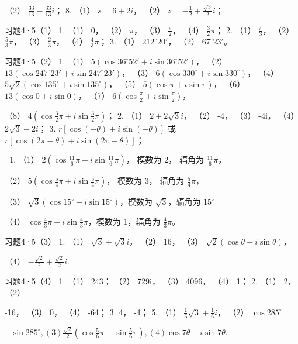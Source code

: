 （2） \(\frac{33}{13} - \frac{33}{13}i\)； 8. （1） \(s = 6 + 2i\)，
（2） \(z = -\frac{1}{2} + \frac{\sqrt{3}}{2}i\)；

习题4·5（1） 1. （1） 0， （2） \(\pi\)， （3） \(\frac{\pi}{2}\)，
（4） \(\frac{3}{2}\pi\)； 2. （1） \(\frac{\pi}{3}\)， （2）
\(\frac{5}{3}\pi\)， （3） \(\frac{2}{3}\pi\)， （4）
\(\frac{4}{3}\pi\)； 3. （1） \(212^{\circ}20'\)， （2）
\(67^{\circ}23'\)。

习题4·5（2） 1. （1） \(5(\cos 36^{\circ}52' + i\sin 36^{\circ}52')\)，
（2） \(13(\cos 247^{\circ}23' + i\sin 247^{\circ}23')\)， （3）
\(6(\cos 330^{\circ} + i\sin 330^{\circ})\)， （4）
\(5\sqrt{2}(\cos 135^{\circ} + i\sin 135^{\circ})\)， （5）
\(5(\cos \pi + i\sin \pi)\)， （6） \(13(\cos 0 + i\sin 0)\)， （7）
\(6\left(\cos \frac{\pi}{2} + i\sin \frac{\pi}{2}\right)\)，

（8） \(4\left(\cos \frac{3}{2}\pi + i\sin \frac{3}{2}\pi\right)\)； 2.
（1） \(2 + 2\sqrt{3}i\)， （2） -4， （3） -4i， （4）
\(2\sqrt{3} - 2i\)； 3. \(r[\cos (-\theta) + i\sin (-\theta)]\) 或
\(r[\cos (2\pi - \theta) + i\sin (2\pi - \theta)]\)；

\begin{enumerate}[start=4]
\item
  （1） \(2\left(\cos \frac{11}{6}\pi + i\sin \frac{11}{6}\pi\right)\)，
  模数为 2， 辐角为 \(\frac{11}{6}\pi\)，
\end{enumerate}

（2） \(5\left(\cos \frac{5}{4}\pi + i\sin \frac{5}{4}\pi\right)\)，
模数为 3， 辐角为 \(\frac{5}{4}\pi\)，

（3） \(\sqrt{3} (\cos 15^{\circ} + i\sin 15^{\circ})\)，模数为
\(\sqrt{3}\)，辐角为 \(15^{\circ}\)

（4） \(\cos \frac{4}{3}\pi + i\sin \frac{4}{3}\pi\)，模数为 1，辐角为
\(\frac{4}{3}\pi\)。

习题4·5（3） 1. （1） \(\sqrt{3} + \sqrt{3} i\)， （2） 16， （3）
\(\sqrt{2} (\cos \theta + i \sin \theta)\)，

（4） \(-\frac{\sqrt{2}}{2} + \frac{\sqrt{2}}{2} i.\)

习题4·5（4） 1. （1） 243； （2） 729i， （3） 4096， （4） 1； 2. （1）
2， （2）

-16， （3） 0， （4） -64； 3. 4， -4； 5. （1）
\(\frac{1}{6}\sqrt{3} + \frac{1}{6}i\)， （2） \(\cos 285^\circ\)

\(+\sin285^{\circ},(3)\frac{\sqrt{2}}{2}\left(\cos\frac{5}{6}\pi+\sin\frac{5}{6}\pi\right),(4)\cos7\theta+i\sin7\theta.\)

